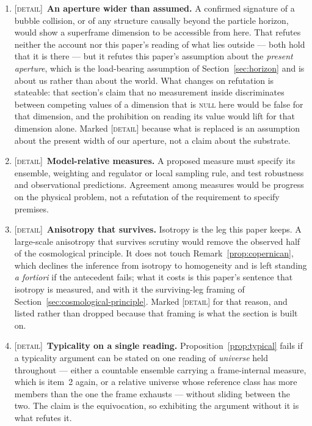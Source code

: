 \documentclass[11pt,a4paper]{article}
\theoremstyle{remark}\newtheorem{remark}[definition]{Remark}
\begin{document}
\begin{enumerate}[leftmargin=*]
\item \textsc{[detail]}~\textbf{An aperture wider than assumed.} A confirmed signature of a bubble
collision, or of any structure causally beyond the particle horizon, would show a superframe dimension
to be accessible from here. That refutes neither the account nor this paper's reading of what lies
outside --- both hold that it is there --- but it refutes this paper's assumption about the
\emph{present aperture}, which is the load-bearing assumption of Section~\ref{sec:horizon} and is about
us rather than about the world. What changes on refutation is stateable: that section's claim that no
measurement inside discriminates between competing values of a dimension that is
\textnormal{\textsc{null}} here would be false for that dimension, and the prohibition on reading its
value would lift for that dimension alone. Marked \textsc{[detail]} because what is replaced is an
assumption about the present width of our aperture, not a claim about the substrate.

\item \textsc{[detail]}~\textbf{Model-relative measures.} A proposed measure must specify its
ensemble, weighting and regulator or local sampling rule, and test robustness
and observational predictions. Agreement among measures would be progress on
the physical problem, not a refutation of the requirement to specify premises.

\item \textsc{[detail]}~\textbf{Anisotropy that survives.} Isotropy is the leg this paper keeps. A
large-scale anisotropy that survives scrutiny would remove the observed half of the cosmological
principle. It does not touch Remark~\ref{prop:copernican}, which declines the inference from
isotropy to homogeneity and is left standing \emph{a fortiori} if the antecedent fails; what it costs is
this paper's sentence that isotropy is measured, and with it the surviving-leg framing of
Section~\ref{sec:cosmological-principle}. Marked \textsc{[detail]} for that reason, and listed rather
than dropped because that framing is what the section is built on.

\item \textsc{[detail]}~\textbf{Typicality on a single reading.} Proposition~\ref{prop:typical} fails if
a typicality argument can be stated on one reading of \emph{universe} held throughout --- either a
countable ensemble carrying a frame-internal measure, which is item~2 again, or a relative universe
whose reference class has more members than the one the frame exhausts --- without sliding between the
two. The claim is the equivocation, so exhibiting the argument without it is what refutes it.


\end{enumerate}
\end{document}
